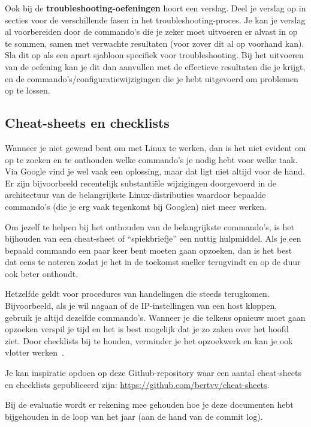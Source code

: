 Ook bij de \textbf{troubleshooting-oefeningen} hoort een verslag. Deel je verslag op in secties voor de verschillende fasen in het troubleshooting-proces. Je kan je verslag al voorbereiden door de commando's die je zeker moet uitvoeren er alvast in op te sommen, samen met verwachte resultaten (voor zover dit al op voorhand kan). Sla dit op als een apart sjabloon specifiek voor troubleshooting. Bij het uitvoeren van de oefening kan je dit dan aanvullen met de effectieve resultaten die je krijgt, en de commando's/configuratiewijzigingen die je hebt uitgevoerd om problemen op te lossen.

\subsection{Cheat-sheets en checklists}%
\label{subs:cheat-sheets-en-checklists}

Wanneer je niet gewend bent om met Linux te werken, dan is het niet evident om op te zoeken en te onthouden welke commando's je nodig hebt voor welke taak. Via Google vind je wel vaak een oplossing, maar dat ligt niet altijd voor de hand. Er zijn bijvoorbeeld recentelijk substantiële wijzigingen doorgevoerd in de architectuur van de belangrijkste Linux-distributies waardoor bepaalde commando's (die je erg vaak tegenkomt bij Googlen) niet meer werken.

Om jezelf te helpen bij het onthouden van de belangrijkste commando's, is het bijhouden van een cheat-sheet of ``spiekbriefje'' een nuttig hulpmiddel. Als je een bepaald commando een paar keer bent moeten gaan opzoeken, dan is het best dat eens te noteren zodat je het in de toekomst sneller terugvindt en op de duur ook beter onthoudt.

Hetzelfde geldt voor procedures van handelingen die steeds terugkomen.  Bijvoorbeeld, als je wil nagaan of de IP-instellingen van een host kloppen, gebruik je altijd dezelfde commando's. Wanneer je die telkens opnieuw moet gaan opzoeken verspil je tijd en het is best mogelijk dat je zo zaken over het hoofd ziet. Door checklists bij te houden, verminder je het opzoekwerk en kan je ook vlotter werken~\autocite{Simmons2009}.

Je kan inspiratie opdoen op deze Github-repository waar een aantal cheat-sheets en checklists gepubliceerd zijn: \url{https://github.com/bertvv/cheat-sheets}.

Bij de evaluatie wordt er rekening mee gehouden hoe je deze documenten hebt bijgehouden in de loop van het jaar (aan de hand van de commit log).

